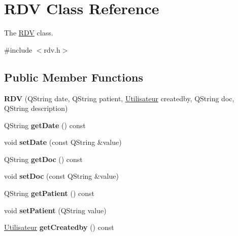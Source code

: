 \hypertarget{class_r_d_v}{}\section{R\+DV Class Reference}
\label{class_r_d_v}


The \mbox{\hyperlink{class_r_d_v}{R\+DV}} class.  




{\ttfamily \#include $<$rdv.\+h$>$}

\subsection*{Public Member Functions}
\begin{DoxyCompactItemize}
\item 
\mbox{\label{class_r_d_v_adeb5f93f4c88e3d6e87043287f083d9f}} 
{\bfseries R\+DV} (Q\+String date, Q\+String patient, \mbox{\hyperlink{class_utilisateur}{Utilisateur}} createdby, Q\+String doc, Q\+String description)
\item 
\mbox{\label{class_r_d_v_a9645f641f76ba6dde15c00704e637fc3}} 
Q\+String {\bfseries get\+Date} () const
\item 
\mbox{\label{class_r_d_v_a33de832512fc2d6542ea961efadf3be4}} 
void {\bfseries set\+Date} (const Q\+String \&value)
\item 
\mbox{\label{class_r_d_v_aab057819a02d3257b3f419a569c5e968}} 
Q\+String {\bfseries get\+Doc} () const
\item 
\mbox{\label{class_r_d_v_a3adc9de12843f5901de9dd1e08954de4}} 
void {\bfseries set\+Doc} (const Q\+String \&value)
\item 
\mbox{\label{class_r_d_v_ad8bcbe648c260b33331ea444cb51b41f}} 
Q\+String {\bfseries get\+Patient} () const
\item 
\mbox{\label{class_r_d_v_a330240101b7580edad087123afbf96a1}} 
void {\bfseries set\+Patient} (Q\+String value)
\item 
\mbox{\label{class_r_d_v_a1e3795af73f12576b94d6c75e65e4df6}} 
\mbox{\hyperlink{class_utilisateur}{Utilisateur}} {\bfseries get\+Createdby} () const

\end{DoxyCompactItemize}
